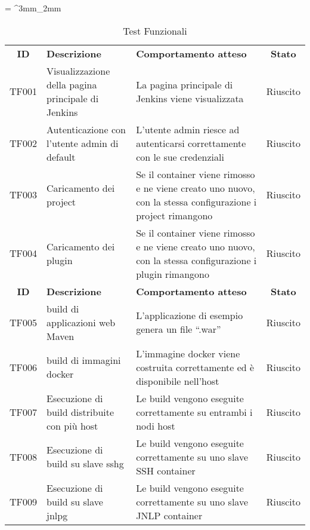 \tabulinesep = ^3mm_2mm
\begin{longtabu} to \textwidth {cXXc}
    \caption[Test Funzionali]{Test Funzionali}
    \label{tab:test}
    \endlastfoot
    \rowfont{\bfseries\sffamily\leavevmode\color{white}}
    \textbf{ID} & \textbf{Descrizione} & \textbf{Comportamento atteso} & \textbf{Stato}\\
    TF001 & Visualizzazione della pagina principale di Jenkins & La pagina principale di Jenkins viene visualizzata & Riuscito\\ %
    TF002 & Autenticazione con l'utente admin di default & L'utente admin riesce ad autenticarsi correttamente con le sue credenziali & Riuscito\\ %
    TF003 & Caricamento dei \gls{project} & Se il container viene rimosso e ne viene creato uno nuovo, con la stessa configurazione i project rimangono & Riuscito\\ %
    TF004 & Caricamento dei \gls{plugin} & Se il container viene rimosso e ne viene creato uno nuovo, con la stessa configurazione i plugin rimangono & Riuscito\\ %
    \newpage
    \rowfont{\bfseries\sffamily\leavevmode\color{white}}
    \textbf{ID} & \textbf{Descrizione} & \textbf{Comportamento atteso} & \textbf{Stato}\\
    TF005 & \gls{build} di applicazioni web Maven\cite[Chapter~10]{book:maven-reference} & L'applicazione di esempio genera un file ``.\gls{war}'' & Riuscito\\ %
    TF006 & \gls{build} di immagini docker & L'immagine docker viene costruita correttamente ed è disponibile nell'\gls{host} & Riuscito\\ %
    TF007 & Esecuzione di \gls{build} distribuite\cite[Chapter~11]{book:jenkins-definitive}\cite{site:jenkins-distributed-builds} con più \gls{host} & Le \gls{build} vengono eseguite correttamente su entrambi i nodi \gls{host} & Riuscito\\ %
    TF008 & Esecuzione di \gls{build} su \gls{slave} \gls{sshg} & Le \gls{build} vengono eseguite correttamente su uno \gls{slave} SSH \gls{container} & Riuscito\\ %
    TF009 & Esecuzione di \gls{build} su \gls{slave} \gls{jnlpg} & Le \gls{build} vengono eseguite correttamente su uno \gls{slave} JNLP \gls{container} & Riuscito\\ %

\end{longtabu}

